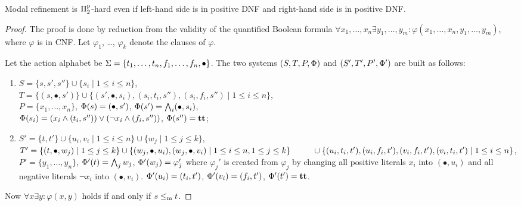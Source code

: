\begin{proposition}\label{p:ldpd}
Modal refinement is $\mathrm\Pi^\mathrm p_2$-hard even if left-hand side is in positive DNF and
right-hand side is in positive DNF.
\end{proposition}
\begin{proof}


The proof is done by reduction from the validity of the quantified
Boolean formula
$\forall x_1, \ldots, x_n \exists y_1, \ldots, y_m : 
\varphi(x_1, \ldots, x_n, y_1, \ldots, y_m)$, where $\varphi$ is in CNF.
Let $\varphi_1$, \ldots, $\varphi_k$ denote the clauses of $\varphi$.


Let the action alphabet be $\mathrm{\Sigma} = \{ t_1, \ldots, t_n, f_1, \ldots, f_n, \bullet \}$.
The two systems $(S,T,P,\mathrm{\Phi})$ and $(S',T',P',\mathrm{\Phi}')$ are built as
follows: 
\begin{enumerate}
    \item 
$S = \{s,s',s'' \} \cup \{s_i \mid 1 \le i \le n\}$,\\
$T = \{(s,\bullet,s')\} \cup \{ (s',\bullet,s_i), (s_i, t_i, s''), 
(s_i, f_i, s'') \mid 1 \le i \le n\}$,\\
$P = \{ x_1, \ldots, x_n\}$,
$\mathrm{\Phi}(s) = (\bullet,s')$,
  $\mathrm{\Phi}(s') = \bigwedge_i (\bullet,s_i)$,\\
  $\mathrm{\Phi}(s_i) = (x_i \wedge (t_i,s'')) \vee (\neg x_i \wedge (f_i,s''))$,
  $\mathrm{\Phi}(s'') = \mathbf{tt}$;
%
\item 
$S' = \{t,t'\} \cup \{ u_i, v_i \mid 1 \le i \le n \}
\cup \{ w_j \mid 1 \le j \le k \}$,\\
$T' = \{ (t,\bullet,w_j) \mid  1 \le j \le k \}
\cup \{ (w_j,\bullet,u_i), (w_j,\bullet,v_i) \mid
1 \le i \le n,  1 \le j \le k \}
\\ ~~\qquad \cup \{ (u_i,t_i,t'), (u_i,f_i,t'), (v_i,f_i,t'), (v_i,t_i,t')
\mid 1 \le i \le n \}$, \\
$P' = \{y_1, \ldots, y_n \}$,
$\mathrm{\Phi}'(t) = \bigwedge_j w_j$,
$\mathrm{\Phi}'(w_j) = \varphi_j'$ where $\varphi_j'$ is created from
$\varphi_j$ by changing all positive literals $x_i$ into $(\bullet,u_i)$
and all negative literals $\neg x_i$ into $(\bullet,v_i)$.
$\mathrm{\Phi}'(u_i) = (t_i,t')$, $\mathrm{\Phi}'(v_i) = (f_i,t')$, $\mathrm{\Phi}'(t') = \mathbf{tt}$.

\end{enumerate}

Now $\forall x \exists y : \varphi(x,y)$ holds if
and only if $s \le_\mathrm m t$.
\end{proof}

